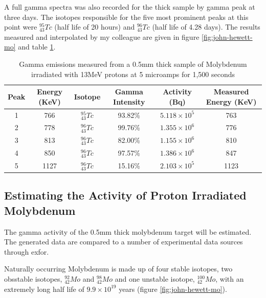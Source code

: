A full gamma spectra was also recorded for the thick sample by gamma peak at three days.  The isotopes responsible for the five most prominent peaks at this point were ${}^{95}_{43}Tc$ (half life of 20 hours\cite{jeff311}) and ${}^{96}_{43}Tc$ (half life of 4.28 days\cite{jeff311}).  The results measured and interpolated by my colleague are given in figure \ref{fig:john-hewett-mo} and table \ref{table:johnhewettresults}.

\FloatBarrier
\begin{table}[h]
\begin{center}
\begin{tabular}{c c c c c c}
\hline\hline
Peak & Energy (KeV) & Isotope & Gamma Intensity & Activity (Bq) & Measured Energy (KeV)\\
\hline\hline
1 & 766 & ${}^{95}_{43}Tc$ & 93.82\% & $5.118 \times 10^{5}$ & 763 \\
2 & 778 & ${}^{96}_{43}Tc$ & 99.76\% & $1.355 \times 10^{6}$ & 776 \\
3 & 813 & ${}^{96}_{43}Tc$ & 82.00\% & $1.155 \times 10^{6}$ & 810 \\
4 & 850 & ${}^{96}_{43}Tc$ & 97.57\% & $1.386 \times 10^{6}$ & 847 \\
5 & 1127 & ${}^{96}_{43}Tc$ & 15.16\% & $2.103 \times 10^{5}$ & 1123 \\
\hline\hline
\end{tabular}
\end{center}
\caption{Gamma emissions measured from a 0.5mm thick sample of Molybdenum irradiated with 13MeV protons at 5 microamps for 1,500 seconds}
\label{table:johnhewettresults}
\end{table}



\subsection{Estimating the Activity of Proton Irradiated Molybdenum}
\label{section:estimatingmoactivity}

The gamma activity of the 0.5mm thick molybdenum target will be estimated.  The generated data are compared to a number of experimental data sources through \acrshort{exfor}.

Naturally occurring Molybdenum is made up of four stable isotopes, two \gls{obsstable} isotopes, ${}^{92}_{42}Mo$ and ${}^{98}_{42}Mo$ and one unstable isotope, ${}^{100}_{42}Mo$, with an extremely long half life of $9.9 \times 10^19$ years (figure \ref{fig:john-hewett-mo}).

